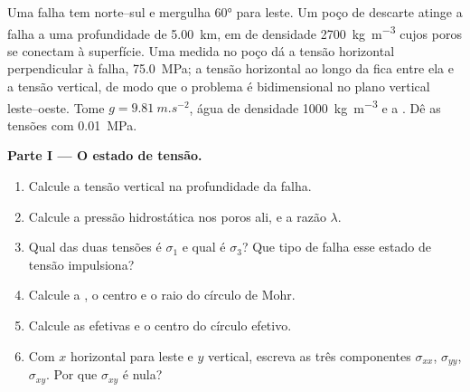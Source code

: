 \begin{problem}
\label{pb:b1:stress-strain-rheology:1}
Uma falha tem  norte--sul e mergulha \ang{60} para leste. Um poço de descarte atinge a falha a uma profundidade de \qty{5.00}{km}, em  de densidade
\qty{2700}{kg.m^{-3}} cujos poros se conectam à superfície. Uma medida no poço dá a tensão horizontal perpendicular à falha,
\qty{75.0}{MPa}; a tensão horizontal ao longo da  fica entre ela e a tensão vertical, de modo que o problema é bidimensional no plano vertical leste--oeste. Tome $g = \qty{9.81}{m.s^{-2}}$, água de densidade
\qty{1000}{kg.m^{-3}} e a . Dê as tensões com
\qty{0.01}{MPa}.

\medskip
\noindent\textbf{Parte I --- O estado de tensão.}
\begin{enumerate}
  \item Calcule a tensão vertical na profundidade da falha.
  \item Calcule a pressão hidrostática nos poros ali, e a razão $\lambda$.
  \item Qual das duas tensões é $\sigma_1$ e qual é $\sigma_3$? Que tipo de falha esse estado de tensão impulsiona?
  \item Calcule a , o centro e o raio do círculo de Mohr.
  \item Calcule as  efetivas e o centro do círculo efetivo.
  \item Com $x$ horizontal para leste e $y$ vertical, escreva as três componentes $\sigma_{xx}$, $\sigma_{yy}$, $\sigma_{xy}$. Por que $\sigma_{xy}$ é nula?
\end{enumerate}


\end{problem}
